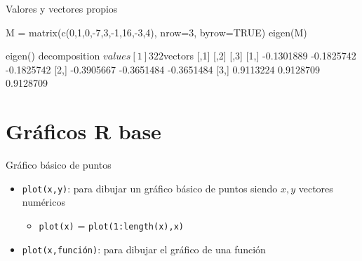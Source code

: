 \documentclass[
  ignorenonframetext,
  aspectratio=169]{beamer}
\newenvironment{Shaded}{\begin{snugshade}}{\end{snugshade}}
\newcommand{\AttributeTok}[1]{\textcolor[rgb]{0.77,0.63,0.00}{#1}}
\newcommand{\ConstantTok}[1]{\textcolor[rgb]{0.00,0.00,0.00}{#1}}
\newcommand{\DecValTok}[1]{\textcolor[rgb]{0.00,0.00,0.81}{#1}}
\newcommand{\FunctionTok}[1]{\textcolor[rgb]{0.00,0.00,0.00}{#1}}
\newcommand{\NormalTok}[1]{#1}
\newcommand{\OtherTok}[1]{\textcolor[rgb]{0.56,0.35,0.01}{#1}}
\newcommand{\SpecialCharTok}[1]{\textcolor[rgb]{0.00,0.00,0.00}{#1}}
\providecommand{\tightlist}{%
  \setlength{\itemsep}{0pt}\setlength{\parskip}{0pt}}
\let\oldverbatim\verbatim
\let\endoldverbatim\endverbatim
\renewenvironment{verbatim}{\tiny\oldverbatim}{\endoldverbatim}
\begin{document}
\begin{frame}[fragile]{Valores y vectores propios}
\protect\hypertarget{valores-y-vectores-propios-4}{}
\begin{Shaded}
\begin{Highlighting}[]
\NormalTok{M }\OtherTok{=} \FunctionTok{matrix}\NormalTok{(}\FunctionTok{c}\NormalTok{(}\DecValTok{0}\NormalTok{,}\DecValTok{1}\NormalTok{,}\DecValTok{0}\NormalTok{,}\SpecialCharTok{{-}}\DecValTok{7}\NormalTok{,}\DecValTok{3}\NormalTok{,}\SpecialCharTok{{-}}\DecValTok{1}\NormalTok{,}\DecValTok{16}\NormalTok{,}\SpecialCharTok{{-}}\DecValTok{3}\NormalTok{,}\DecValTok{4}\NormalTok{), }\AttributeTok{nrow=}\DecValTok{3}\NormalTok{, }\AttributeTok{byrow=}\ConstantTok{TRUE}\NormalTok{)}
\FunctionTok{eigen}\NormalTok{(M)}
\end{Highlighting}
\end{Shaded}

\begin{verbatim}
eigen() decomposition
$values
[1] 3 2 2

$vectors
           [,1]       [,2]       [,3]
[1,] -0.1301889 -0.1825742 -0.1825742
[2,] -0.3905667 -0.3651484 -0.3651484
[3,]  0.9113224  0.9128709  0.9128709
\end{verbatim}
\end{frame}

\hypertarget{gruxe1ficos-r-base}{%
\section{Gráficos R base}\label{gruxe1ficos-r-base}}

\begin{frame}[fragile]{Gráfico básico de puntos}
\protect\hypertarget{gruxe1fico-buxe1sico-de-puntos}{}
\begin{itemize}
\tightlist
\item
  \texttt{plot(x,y)}: para dibujar un gráfico básico de puntos siendo
  \(x,y\) vectores numéricos

  \begin{itemize}
  \tightlist
  \item
    \texttt{plot(x)} = \texttt{plot(1:length(x),x)}
  \end{itemize}
\item
  \texttt{plot(x,función)}: para dibujar el gráfico de una función
\end{itemize}
\end{frame}
\end{document}
